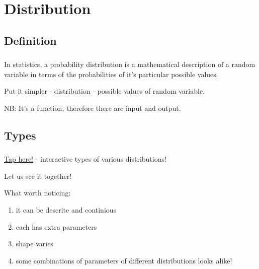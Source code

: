 \documentclass[t, 11pt]{beamer}
\begin{document}
	
	\section{Distribution}
	\subsection{Definition}
		\begin{frame} 
		\frametitle{\insertsection} 
		\framesubtitle{\insertsubsection}
		In statistics, a probability distribution is a mathematical description of a random variable in terms of the probabilities of it's particular possible values.
		
		\vspace{1cm}
		
		 Put it simpler - distribution - possible values of random variable. 
		 
		 \vspace{1cm}
		 
		NB: It's a function, therefore there are input and output.
	\end{frame}
	
	\subsection{Types}
	\begin{frame} 
		\frametitle{\insertsection} 
		\framesubtitle{\insertsubsection}
		
		\href{https://seeing-theory.brown.edu/probability-distributions}{Tap here!} - interactive types of various distributions! 
		
		\vspace{1cm}
		
		Let us see it together! 
		
		What worth noticing: 
		\begin{enumerate}
		\item it can be descrite and continious
		\item each has extra parameters 
		\item shape varies
		\item some combinations of parameters of different distributions looks alike!  
	 \end{enumerate}
	\end{frame}
\end{document}
